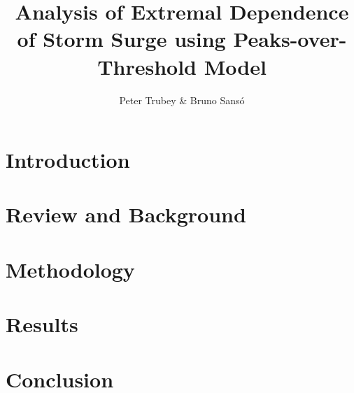\documentclass{article}
\title{Analysis of Extremal Dependence of Storm Surge using Peaks-over-Threshold Model}
\author{Peter Trubey \& Bruno Sans\'o}
\date{}
\begin{document}
\maketitle

\begin{abstract}
    
\end{abstract}

\section{Introduction\label{sec:introduction}}


\section{Review and Background\label{sec:review}}


\section{Methodology\label{sec:methodology}}






\section{Results\label{sec:results}}


\section{Conclusion\label{sec:conclusion}}


\appendix




\end{document}
